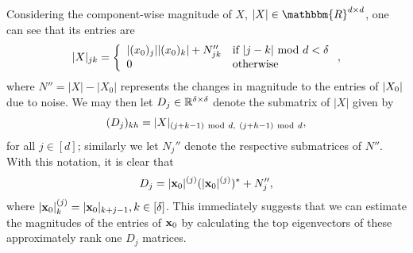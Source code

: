 Considering the component-wise magnitude of $X$, $|X| \in \mathbbm{R}^{d \times d}$, one can see that its entries are 
\begin{equation*}
|X|_{jk} =  \left\{ \begin{array}{ll} |({x}_0)_j| |({x}_0)_{k}| + N''_{jk} & \textrm{if}~| j - k | ~{\rm mod}~d < \delta \\ 0 & \textrm{otherwise} \end{array} \right.,
\end{equation*}
where $N'' = |X| - |X_0|$ represents the changes in magnitude to the entries of $|X_0|$ due to noise. %
We may then let $D_j \in \mathbb{R}^{\delta \times \delta}$ denote the submatrix of $|X|$ given by \[(D_j)_{kh} = |X|_{(j+k-1)~{\rm mod}~d,~(j+h-1)~{\rm mod}~d},\] for all $j \in [d]$; similarly we let $N_j''$ denote the respective submatrices of $N''$.  With this notation, it is clear that \[D_j = |\mathbf x_0|^{(j)} (|\mathbf x_0|^{(j)})^* + N_j'',\] where $|\mathbf x_0|^{(j)}_k = |\mathbf x_0|_{k + j - 1}, k \in [\delta]$.  This immediately suggests that we can estimate the magnitudes of the entries of $\mathbf x_0$ by calculating the top eigenvectors of these approximately rank one $D_j$ matrices.

